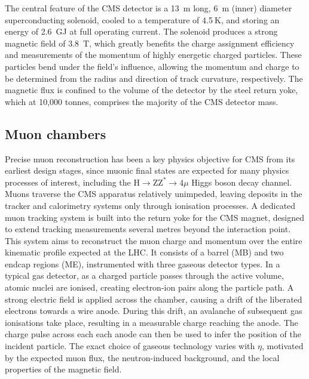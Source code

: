 The central feature of the CMS detector is a 13~m long, 6~m (inner) diameter superconducting solenoid, cooled to a temperature of 4.5$~\mathrm{K}$, and storing an energy of 2.6~GJ at full operating current. The solenoid produces a strong magnetic field of 3.8~T, which greatly benefits the charge assignment efficiency and measurements of the momentum of highly energetic charged particles. These particles bend under the field's influence, allowing the momentum and charge to be determined from the radius and direction of track curvature, respectively. The magnetic flux is confined to the volume of the detector by the steel return yoke, which at 10,000 tonnes, comprises the majority of the CMS detector mass.

\subsection{Muon chambers}

Precise muon reconstruction has been a key physics objective for CMS from its earliest design stages, since muonic final states are expected for many physics processes of interest, including the $\mathrm{H}\rightarrow \mathrm{ZZ}^{*} \rightarrow 4\mu$ Higgs boson decay channel. Muons traverse the CMS apparatus relatively unimpeded, leaving deposits in the tracker and calorimetry systems only through ionisation processes. A dedicated muon tracking system is built into the return yoke for the CMS magnet, designed to extend tracking measurements several metres beyond the interaction point. This system aims to reconstruct the muon charge and momentum over the entire kinematic profile expected at the LHC. It consists of a barrel (MB) and two endcap regions (ME), instrumented with three gaseous detector types. In a typical gas detector, as a charged particle passes through the active volume, atomic nuclei are ionised, creating electron-ion pairs along the particle path. A strong electric field is applied across the chamber, causing a drift of the liberated electrons towards a wire anode. During this drift, an avalanche of subsequent gas ionisations take place, resulting in a measurable charge reaching the anode. The charge pulse across each each anode can then be used to infer the position of the incident particle.
The exact choice of gaseous technology varies with $\eta$, motivated by the expected muon flux, the neutron-induced background, and the local properties of the magnetic field. 
 
